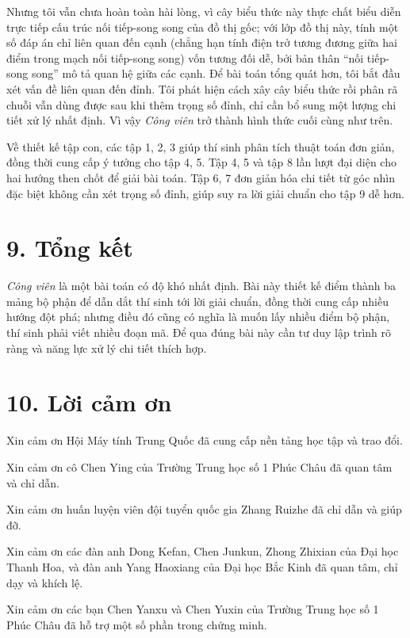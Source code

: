 \documentclass[11pt]{article}
\begin{document}
Nhưng tôi vẫn chưa hoàn toàn hài lòng, vì cây biểu thức này thực chất biểu
diễn trực tiếp cấu trúc nối tiếp-song song của đồ thị gốc; với lớp đồ thị này,
tính một số đáp án chỉ liên quan đến cạnh (chẳng hạn tính điện trở tương đương
giữa hai điểm trong mạch nối tiếp-song song) vốn tương đối dễ, bởi bản thân
``nối tiếp-song song'' mô tả quan hệ giữa các cạnh. Để bài toán tổng quát hơn,
tôi bắt đầu xét vấn đề liên quan đến đỉnh. Tôi phát hiện cách xây cây biểu
thức rồi phân rã chuỗi vẫn dùng được sau khi thêm trọng số đỉnh, chỉ cần bổ
sung một lượng chi tiết xử lý nhất định. Vì vậy \emph{Công viên} trở thành
hình thức cuối cùng như trên.

Về thiết kế tập con, các tập 1, 2, 3 giúp thí sinh phân tích thuật toán đơn
giản, đồng thời cung cấp ý tưởng cho tập 4, 5. Tập 4, 5 và tập 8 lần lượt đại
diện cho hai hướng then chốt để giải bài toán. Tập 6, 7 đơn giản hóa chi tiết
từ góc nhìn đặc biệt không cần xét trọng số đỉnh, giúp suy ra lời giải chuẩn
cho tập 9 dễ hơn.

\section*{9. Tổng kết}

\emph{Công viên} là một bài toán có độ khó nhất định. Bài này thiết kế điểm
thành ba mảng bộ phận để dẫn dắt thí sinh tới lời giải chuẩn, đồng thời cung
cấp nhiều hướng đột phá; nhưng điều đó cũng có nghĩa là muốn lấy nhiều điểm
bộ phận, thí sinh phải viết nhiều đoạn mã. Để qua đúng bài này cần tư duy lập
trình rõ ràng và năng lực xử lý chi tiết thích hợp.

\section*{10. Lời cảm ơn}

Xin cảm ơn Hội Máy tính Trung Quốc đã cung cấp nền tảng học tập và trao đổi.

Xin cảm ơn cô Chen Ying của Trường Trung học số 1 Phúc Châu đã quan tâm và chỉ
dẫn.

Xin cảm ơn huấn luyện viên đội tuyển quốc gia Zhang Ruizhe đã chỉ dẫn và giúp
đỡ.

Xin cảm ơn các đàn anh Dong Kefan, Chen Junkun, Zhong Zhixian của Đại học
Thanh Hoa, và đàn anh Yang Haoxiang của Đại học Bắc Kinh đã quan tâm, chỉ dạy
và khích lệ.

Xin cảm ơn các bạn Chen Yanxu và Chen Yuxin của Trường Trung học số 1 Phúc
Châu đã hỗ trợ một số phần trong chứng minh.
\end{document}
